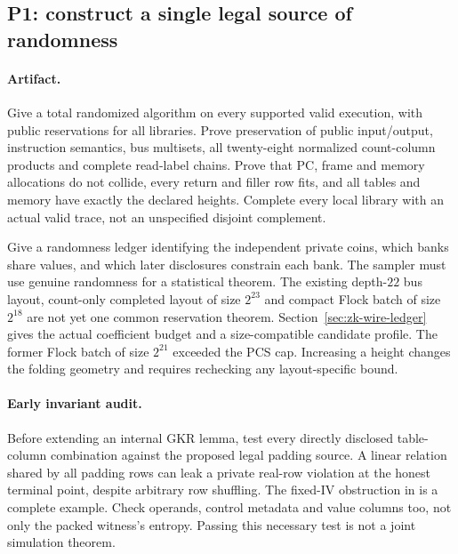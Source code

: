 \subsection{P1: construct a single legal source of randomness}

\paragraph{Artifact.} Give a total randomized algorithm on every supported valid execution, with public reservations for all libraries. Prove preservation of public input/output, instruction semantics, bus multisets, all twenty-eight normalized count-column products and complete read-label chains. Prove that PC, frame and memory allocations do not collide, every return and filler row fits, and all tables and memory have exactly the declared heights. Complete every local library with an actual valid trace, not an unspecified disjoint complement.

Give a randomness ledger identifying the independent private coins, which banks share values, and which later disclosures constrain each bank. The sampler must use genuine randomness for a statistical theorem. The existing depth-$22$ bus layout, count-only completed layout of size $2^{23}$ and compact Flock batch of size $2^{18}$ are not yet one common reservation theorem. Section~\ref{sec:zk-wire-ledger} gives the actual coefficient budget and a size-compatible candidate profile. The former Flock batch of size $2^{21}$ exceeded the PCS cap. Increasing a height changes the folding geometry and requires rechecking any layout-specific bound.

\paragraph{Early invariant audit.} Before extending an internal GKR lemma, test every directly disclosed table-column combination against the proposed legal padding source. A linear relation shared by all padding rows can leak a private real-row violation at the honest terminal point, despite arbitrary row shuffling. The fixed-IV obstruction in  is a complete example. Check operands, control metadata and value columns too, not only the packed witness's entropy. Passing this necessary test is not a joint simulation theorem.

